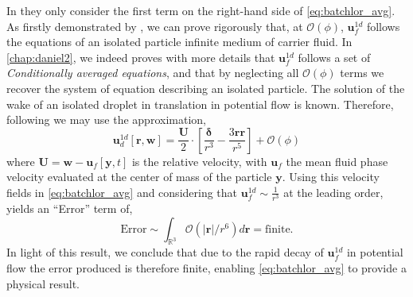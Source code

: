 In \citet{van1998pseudo} they only consider the first term on the right-hand side of \ref{eq:batchlor_avg}. 
As firstly demonstrated by \citet{hinch1977averaged}, we can prove rigorously that, at $\mathcal{O}(\phi)$, $\textbf{u}_f^{1d}$ follows the equations of an isolated particle infinite medium of carrier fluid. 
In \ref{chap:daniel2}, we indeed proves with more details that $\textbf{u}_f^{1d}$ follows a set of \textit{Conditionally averaged equations}, and that by neglecting all $\mathcal{O}(\phi)$ terms we recover the system of equation describing an isolated particle. 
The solution of the wake of an isolated droplet in translation in potential flow is known. 
Therefore, following \citet{van1998pseudo,zhang1994averaged} we may use the approximation, 
\begin{equation}
    \textbf{u}_d^{1d}[\textbf{r},\textbf{w}]
    = 
    \frac{\textbf{U}}{2}\cdot \left[
        \frac{\bm\delta}{r^3}-\frac{3\textbf{rr}}{r^5}
    \right]
    + \mathcal{O}(\phi)
    \label{eq:potential_sol}
\end{equation}
where $\textbf{U} = \textbf{w} - \textbf{u}_f[\textbf{y},t]$ is the relative velocity, with $\textbf{u}_f$ the mean fluid phase velocity evaluated at the center of mass of the particle $\textbf{y}$. 
Using this velocity fields in \ref{eq:batchlor_avg} and considering that $\textbf{u}_f^{1d}\sim \frac{1}{r^3}$ at the leading order, yields an ``Error'' term of,  
\begin{equation*}
    \text{Error}
    \sim
    \int_{\mathbb{R}^3}
    \mathcal{O}(|\textbf{r}|/r^6)
    d\textbf{r}
    = \text{finite}. 
\end{equation*}
In light of this result, we conclude that due to the rapid decay of $\textbf{u}_f^{1d}$ in potential flow the error produced is therefore finite, enabling \ref{eq:batchlor_avg} to provide a physical result.

